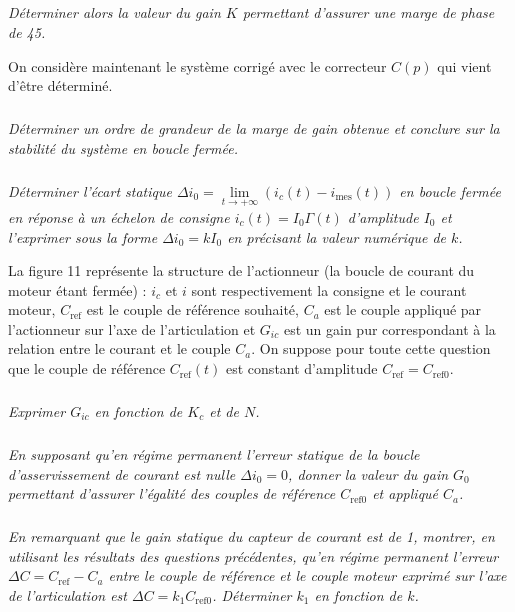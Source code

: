 \begin{multicols}{2}
\subparagraph{}\textit{Déterminer alors la valeur du gain $K$ permettant d’assurer une marge de phase de 45\degres.}
\ifprof
\begin{corrige}
\end{corrige}
\else
\fi

On considère maintenant le système corrigé avec le correcteur $C(p)$ qui vient d’être déterminé.


\subparagraph{}\textit{Déterminer un ordre de grandeur de la marge de gain obtenue et conclure sur la stabilité du système en
boucle fermée.}
\ifprof
\begin{corrige}
\end{corrige}
\else
\fi


\subparagraph{}\textit{Déterminer l'écart statique $\Delta i_0 = \lim\limits_{t\to +\infty} \left(i_c(t)-i_{\text{mes}}(t)\right)$ en boucle fermée en réponse à un échelon de consigne $i_c(t) = I_0\Gamma(t)$ d’amplitude $I_0$ et l’exprimer sous la forme $\Delta i_0 =  kI_0$ en précisant la valeur numérique de $k$.
}
\ifprof
\begin{corrige}
\end{corrige}
\else
\fi

La figure 11 représente la structure de l’actionneur (la boucle de courant du moteur étant fermée) : $i_c$ et $i$
sont respectivement la consigne et le courant moteur, $C_{\text{ref}}$ est le couple de référence souhaité, $C_a$ est le couple
appliqué par l’actionneur sur l’axe de l’articulation et $G_{ic}$ est un gain pur correspondant à la relation entre le
courant et le couple $C_a$. On suppose pour toute cette question que le couple de référence $C_{\text{ref}} (t)$ est constant
d’amplitude $C_{\text{ref}} = C_{\text{ref0}}$.

\subparagraph{}\textit{Exprimer $G_{ic}$ en fonction de $K_c$ et de $N$.
}
\ifprof
\begin{corrige}
\end{corrige}
\else
\fi


\subparagraph{}\textit{
En supposant qu’en régime permanent l’erreur statique de la boucle d’asservissement de courant est nulle
$\Delta i_0= 0$, donner la valeur du gain $G_0$ permettant d’assurer l’égalité des couples de référence $C_{\text{ref0}}$ et appliqué $C_a$.}
\ifprof
\begin{corrige}
\end{corrige}
\else
\fi

\subparagraph{}\textit{
En remarquant que le gain statique du capteur de courant est de 1, montrer, en utilisant les résultats des questions précédentes, qu’en régime permanent l’erreur $\Delta C= C_{\text{ref}} -C_a$
entre le couple de référence et le couple moteur exprimé sur l’axe de l’articulation est $\Delta C= k_1C_{\text{ref0}}$. Déterminer $k_1$ en fonction de $k$.}
\ifprof
\begin{corrige}
\end{corrige}
\else
\fi



\end{multicols}
